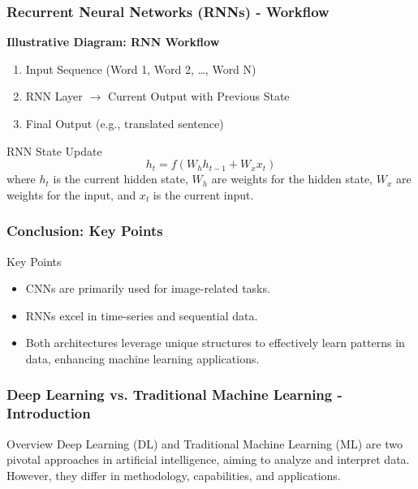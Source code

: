 \documentclass[aspectratio=169]{beamer}
\begin{document}
\begin{frame}[fragile]
    \frametitle{Recurrent Neural Networks (RNNs) - Workflow}
    \textbf{Illustrative Diagram: RNN Workflow}
    \begin{enumerate}
        \item Input Sequence (Word 1, Word 2, …, Word N)
        \item RNN Layer $\rightarrow$ Current Output with Previous State
        \item Final Output (e.g., translated sentence)
    \end{enumerate}

    \begin{block}{RNN State Update}
        \begin{equation}
        h_t = f(W_h h_{t-1} + W_x x_t)
        \end{equation}
        where \( h_t \) is the current hidden state, \( W_h \) are weights for the hidden state, \( W_x \) are weights for the input, and \( x_t \) is the current input.
    \end{block}
\end{frame}

\begin{frame}[fragile]
    \frametitle{Conclusion: Key Points}
    \begin{block}{Key Points}
        \begin{itemize}
            \item CNNs are primarily used for image-related tasks.
            \item RNNs excel in time-series and sequential data.
            \item Both architectures leverage unique structures to effectively learn patterns in data, enhancing machine learning applications.
        \end{itemize}
    \end{block}
\end{frame}

\begin{frame}[fragile]
    \frametitle{Deep Learning vs. Traditional Machine Learning - Introduction}
    \begin{block}{Overview}
        Deep Learning (DL) and Traditional Machine Learning (ML) are two pivotal approaches in artificial intelligence, aiming to analyze and interpret data. However, they differ in methodology, capabilities, and applications.
    \end{block}
\end{frame}
\end{document}
